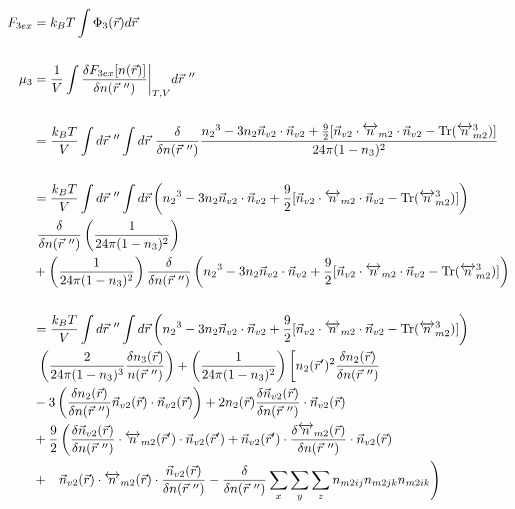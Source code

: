 \documentclass[double,12pt]{beavtex}
\begin{document}
\begin{align}
  F_{3ex} &= k_BT\int \Phi_3(\vec r) d\vec r  \\ 
  \nonumber\\ 
  \mu_3 &= \frac{1}{V}\int \frac{\delta F_{3ex}[n(\vec r)]}{\delta n(\vec r~'')}
  \bigg|_{T,V} d\vec r~'' \\ \nonumber \\
%
   &= \frac{k_BT}{V}\int d\vec r~''\int d\vec r~\frac{\delta}{\delta 
    n(\vec r~'')}\frac{{n_2}^3-3n_2\vec{n}_{v2}\cdot\vec{n}_{v2}+\frac{9}{2}
    [\vec{n}_{v2}\cdot{\overleftrightarrow{n}_{m2}}\cdot{\vec{n}_{v2}}
    -\operatorname{Tr}({\overleftrightarrow{n}^3_{m2}})]}{24\pi(1-n_3)^2}
     \nonumber \\ \\
%
     &=\frac{k_BT}{V}\int d\vec r~''\int d\vec r \left( {n_2}^3-3n_2
     \vec{n}_{v2}\cdot\vec{n}_{v2} 
     +\frac{9}{2}[\vec{n}_{v2}\cdot{\overleftrightarrow{n}_{m2}}\cdot{
     \vec{n}_{v2}}-\operatorname{Tr}({\overleftrightarrow{n}^3_{m2}})]
     \right) \nonumber\\
      &~ \frac{\delta}{\delta n(\vec r~'')}\left(\frac{1}{24\pi(1-n_3)^2}
      \right) \nonumber\\
     &+ \left(\frac{1}{24\pi(1-n_3)^2}\right)\frac{\delta}
     {\delta n(\vec r~'')}\left({n_2}^3-3n_2\vec{n}_{v2}\cdot\vec{n}_{v2}
     +\frac{9}{2}[\vec{n}_{v2}\cdot{\overleftrightarrow{n}_{m2}}\cdot{
     \vec{n}_{v2}}-\operatorname{Tr}({\overleftrightarrow{n}^3_{m2}})]
     \right) \\ \nonumber \\
%
    &=\frac{k_BT}{V}\int d\vec r~''\int d\vec r\left( {n_2}^3-3n_2
    \vec{n}_{v2}\cdot\vec{n}_{v2} 
     +\frac{9}{2}[\vec{n}_{v2}\cdot{\overleftrightarrow{n}_{m2}}\cdot{
     \vec{n}_{v2}}-\operatorname{Tr}({\overleftrightarrow{n}^3_{m2}})]
     \right) \nonumber\\
     &~\left(\frac{2}{24\pi(1-n_3)^3}\frac{\delta n_3(\vec r)}{n(\vec r~'')}
     \right) 
     + \left(\frac{1}{24\pi(1-n_3)^2}\right)\left[n_2(\vec r')^2
     \frac{\delta n_2(\vec r)}{\delta n(\vec r~'')} \color{white}\right]
      \nonumber\\
     &- 3\left(\frac{\delta n_{2}(\vec r)}{\delta n(\vec r~'')}\vec n_{v2}
     (\vec r) \cdot \vec n_{v2}(\vec r)\right) + 2n_2(\vec r)\frac{\delta
     \vec n_{v2}(\vec r)}{\delta n(\vec r~'')}\cdot \vec n_{v2}(\vec r) 
     \nonumber\\
     &+\frac{9}{2}\left(\frac{\delta \vec n_{v2}(\vec r)}{\delta n(\vec r~'')}
     \cdot \overleftrightarrow n_{m2}(\vec r')\cdot \vec n_{v2}( \vec r')
     +\vec n_{v2}(\vec r')\cdot \frac{\delta \overleftrightarrow n_{m2}
     (\vec r)}{\delta n(\vec r~'')}\cdot \vec n_{v2}( \vec r)\color{white}
     \right)\nonumber\\
     &+ \color{white}\left(\color{black}\vec n_{v2}( \vec r)\cdot 
     \overleftrightarrow n_{m2}(\vec r)
     \cdot \frac{\vec n_{v2}( \vec r)}{\delta n(\vec r~'')}-
     \frac{\delta}{\delta n(\vec r~'')}\sum_x\sum_y\sum_z n_{m2ij}n_{m2jk}
     n_{m2ik}\right) 
\end{align} 
\end{document}
